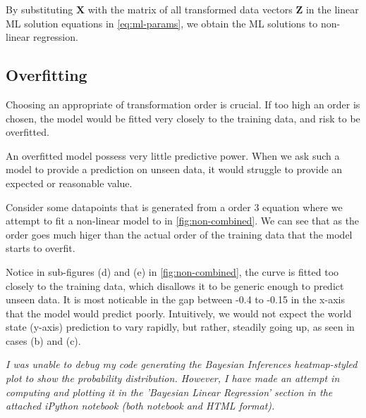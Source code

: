 \documentclass[11pt,openright,a4paper]{article}
\numberwithin{equation}{section}
\begin{document}
By substituting $\mathbf{X}$ with the matrix of all transformed data vectors $\mathbf{Z}$ in the linear ML solution equations in \autoref{eq:ml-params}, we obtain the ML solutions to non-linear regression.

\subsection{Overfitting}
Choosing an appropriate of transformation order is crucial. If too high an order is chosen, the model would be fitted very closely to the training data, and risk to be overfitted. 

An overfitted model possess very little predictive power. When we ask such a model to provide a prediction on unseen data, it would struggle to provide an expected or reasonable value.

Consider some datapoints that is generated from a order 3 equation where we attempt to fit a non-linear model to in \autoref{fig:non-combined}. We can see that as the order goes much higer than the actual order of the training data that the model starts to overfit.

Notice in sub-figures (d) and (e) in \autoref{fig:non-combined}, the curve is fitted too closely to the training data, which disallows it to be generic enough to predict unseen data. It is most noticable in the gap between -0.4 to -0.15 in the x-axis that the model would predict poorly. Intuitively, we would not expect the world state (y-axis) prediction to vary rapidly, but rather, steadily going up, as seen in cases (b) and (c).

\textit{I was unable to debug my code generating the Bayesian Inferences heatmap-styled plot to show the probability distribution. However, I have made an attempt in computing and plotting it in the 'Bayesian Linear Regression' section in the attached iPython notebook (both notebook and HTML format).}


\end{document}
